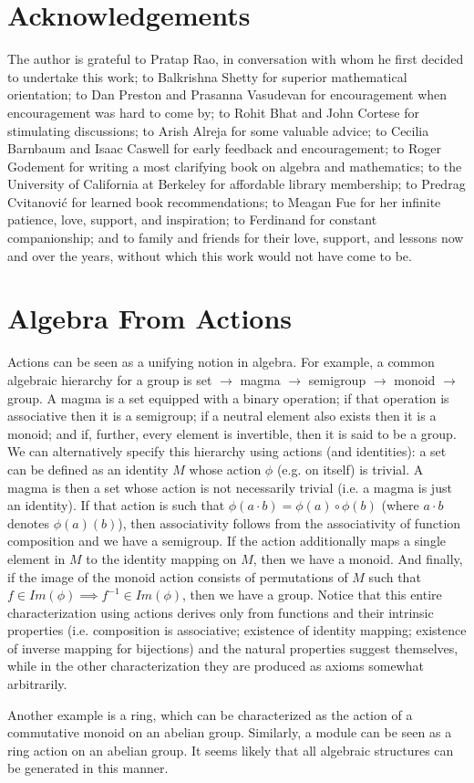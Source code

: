 \documentclass[pra,twocolumn,groupedaddress,10pt]{revtex4}
\theoremstyle{definition}
\begin{document}
\section{Acknowledgements} \label{sec:acknowledgements}

The author is grateful to Pratap Rao, in conversation with whom he first decided to undertake this work; to Balkrishna Shetty\cite{shetty} for superior mathematical orientation; to Dan Preston and Prasanna Vasudevan for encouragement when encouragement was hard to come by; to Rohit Bhat and John Cortese for stimulating discussions; to Arish Alreja for some valuable advice; to Cecilia Barnbaum and Isaac Caswell for early feedback and encouragement; to Roger Godement for writing a most clarifying book\cite{godement} on algebra and mathematics; to the University of California at Berkeley for affordable library membership; to Predrag Cvitanovi\'{c} for learned book recommendations; to Meagan Fue for her infinite patience, love, support, and inspiration; to Ferdinand for constant companionship; and to family and friends for their love, support, and lessons now and over the years, without which this work would not have come to be.




\appendix

\section{Algebra From Actions} \label{app:algact}

Actions can be seen as a unifying notion in algebra. For example, a common algebraic hierarchy for a group is \textsf{set} $\rightarrow$ \textsf{magma} $\rightarrow$ \textsf{semigroup} $\rightarrow$ \textsf{monoid} $\rightarrow$ \textsf{group}. A magma is a set equipped with a binary operation; if that operation is associative then it is a semigroup; if a neutral element also exists then it is a monoid; and if, further, every element is invertible, then it is said to be a group. We can alternatively specify this hierarchy using actions (and identities): a set can be defined as an identity $M$ whose action $\phi$ (e.g. on itself) is trivial. A magma is then a set whose action is not necessarily trivial (i.e. a magma is just an identity). If that action is such that $\phi(a \cdot b) = \phi(a) \circ \phi(b)$ (where $a \cdot b$ denotes $\phi(a)(b)$), then associativity follows from the associativity of function composition and we have a semigroup. If the action additionally maps a single element in $M$ to the identity mapping on $M$, then we have a monoid. And finally, if the image of the monoid action consists of permutations of $M$ such that $f \in Im(\phi) \implies f^{-1} \in Im(\phi)$, then we have a group. Notice that this entire characterization using actions derives only from functions and their intrinsic properties (i.e. composition is associative; existence of identity mapping; existence of inverse mapping for bijections) and the natural properties suggest themselves, while in the other characterization they are produced as axioms somewhat arbitrarily.

Another example is a ring, which can be characterized as the action of a commutative monoid on an abelian group. Similarly, a module can be seen as a ring action on an abelian group. It seems likely that all algebraic structures can be generated in this manner.
\end{document}
